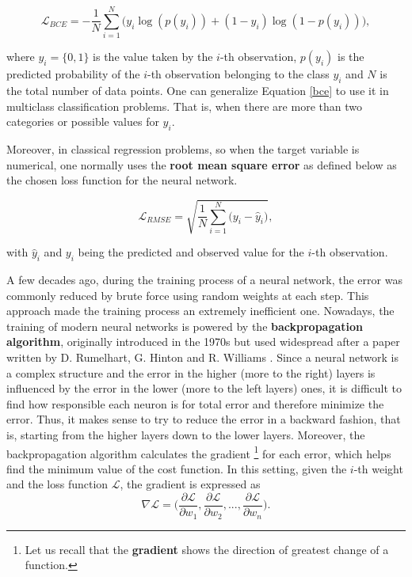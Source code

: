 \documentclass[11pt]{article}
\theoremstyle{definition}
\begin{document}
\begin{equation} \label{bce}
    \mathcal{L}_{BCE} = -\frac{1}{N} \sum_{i=1}^N \Big( y_i \log(p(y_i)) + (1-y_i) \log(1-p(y_i)) \Big),
\end{equation}

where $y_i = \{0, 1\}$ is the value taken by the $i$-th observation, $p(y_i)$ is the predicted probability of the $i$-th observation belonging to the class $y_i$ and $N$ is the total number of data points. One can generalize Equation \ref{bce} to use it in multiclass classification problems. That is, when there are more than two categories or possible values for $y_i$. 

Moreover, in classical regression problems, so when the target variable is numerical, one normally uses the \textbf{root mean square error} as defined below as the chosen loss function for the neural network.

\begin{equation*}
    \mathcal{L}_{RMSE} = \sqrt{\frac{1}{N} \sum_{i=1}^N \big( y_i - \hat{y}_i \big)}, 
\end{equation*}

with $\hat{y}_i$ and $y_i$ being the predicted and observed value for the $i$-th observation. 

A few decades ago, during the training process of a neural network, the error was commonly reduced by brute force using random weights at each step. This approach made the training process an extremely inefficient one. Nowadays, the training of modern neural networks is powered by the \textbf{backpropagation algorithm}, originally introduced in the 1970s but used widespread after a paper written by D. Rumelhart, G. Hinton and R. Williams \cite{rumelhart}. Since a neural network is a complex structure and the error in the higher (more to the right) layers is influenced by the error in the lower (more to the left layers) ones, it is difficult to find how responsible each neuron is for total error and therefore minimize the error. Thus, it makes sense to try to reduce the error in a backward fashion, that is, starting from the higher layers down to the lower layers. Moreover, the backpropagation algorithm calculates the gradient \footnote{Let us recall that the \textbf{gradient} shows the direction of greatest change of a function.} for each error, which helps find the minimum value of the cost function. In this setting, given the $i$-th weight and the loss function $\mathcal{L}$, the gradient is expressed as
\begin{equation*}
    \nabla \mathcal{L} = \Big( \dfrac{\partial \mathcal{L}}{\partial w_1}, \dfrac{\partial \mathcal{L}}{\partial w_2}, ..., \dfrac{\partial \mathcal{L}}{\partial w_n} \Big). 
\end{equation*}
\end{document}
